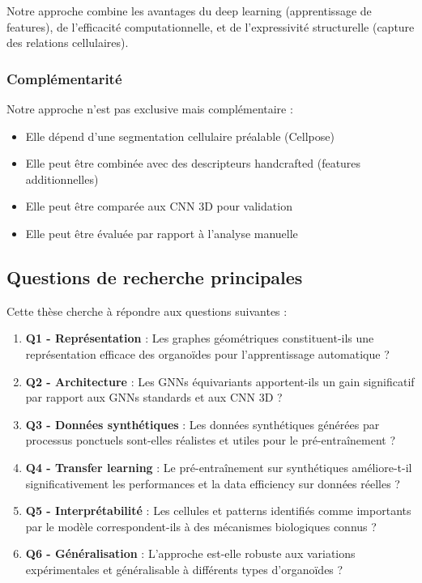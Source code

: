 Notre approche combine les avantages du deep learning (apprentissage de features), de l'efficacité computationnelle, et de l'expressivité structurelle (capture des relations cellulaires).

\subsubsection{Complémentarité}

Notre approche n'est pas exclusive mais complémentaire :
\begin{itemize}
    \item Elle dépend d'une segmentation cellulaire préalable (Cellpose)
    \item Elle peut être combinée avec des descripteurs handcrafted (features additionnelles)
    \item Elle peut être comparée aux CNN 3D pour validation
    \item Elle peut être évaluée par rapport à l'analyse manuelle
\end{itemize}

\subsection{Questions de recherche principales}

Cette thèse cherche à répondre aux questions suivantes :

\begin{enumerate}
    \item \textbf{Q1 - Représentation} : Les graphes géométriques constituent-ils une représentation efficace des organoïdes pour l'apprentissage automatique ?
    
    \item \textbf{Q2 - Architecture} : Les GNNs équivariants apportent-ils un gain significatif par rapport aux GNNs standards et aux CNN 3D ?
    
    \item \textbf{Q3 - Données synthétiques} : Les données synthétiques générées par processus ponctuels sont-elles réalistes et utiles pour le pré-entraînement ?
    
    \item \textbf{Q4 - Transfer learning} : Le pré-entraînement sur synthétiques améliore-t-il significativement les performances et la data efficiency sur données réelles ?
    
    \item \textbf{Q5 - Interprétabilité} : Les cellules et patterns identifiés comme importants par le modèle correspondent-ils à des mécanismes biologiques connus ?
    
    \item \textbf{Q6 - Généralisation} : L'approche est-elle robuste aux variations expérimentales et généralisable à différents types d'organoïdes ?
\end{enumerate}
